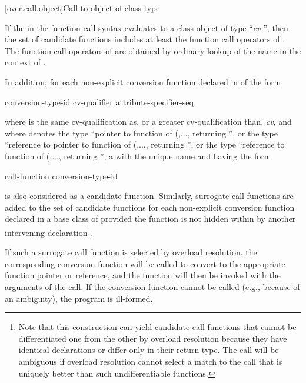 [over.call.object]{Call to object of class type}

\pnum
If the
in the function call syntax evaluates
to a class object of type ``\textit{cv}
'',
then the set of candidate
functions includes at least the function call operators of
.
The
function call operators of
are obtained by ordinary lookup of
the name
in the context of
.

\pnum
In addition, for each non-explicit conversion function declared in  of the
form

\begin{ncsimplebnf}
 conversion-type-id \terminal{(\,)} cv-qualifier attribute-specifier-seq\opt \terminal{;}
\end{ncsimplebnf}

where
is the same cv-qualification as, or a greater cv-qualification than,
\textit{cv},
and where
denotes the type ``pointer to function
of (,..., returning '',
or the type ``reference to pointer to function
of (,..., returning '',
or the type
``reference to function of (,...,
returning '', a  with the unique name
and having the form

\begin{ncbnf}
 call-function \terminal{(} conversion-type-id  
\end{ncbnf}

is also considered as a candidate function.
Similarly, surrogate
call functions are added to the set of candidate functions for
each non-explicit conversion function declared in a base class of
provided the function is not hidden within
by another
intervening declaration\footnote{Note that this construction can yield
candidate call functions that cannot be
differentiated one from the other by overload resolution because they have
identical
declarations or differ only in their return type.
The call will be ambiguous
if overload
resolution cannot select a match to the call that is uniquely better than such
undifferentiable functions.}.

\pnum
If such a surrogate call function is selected by overload
resolution, the corresponding conversion function will be called to convert
to the appropriate function pointer or reference, and the function
will then be invoked with the arguments of the call. If the
conversion function cannot be called (e.g., because of an ambiguity),
the program is ill-formed.

